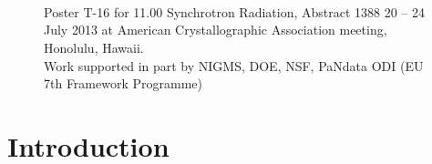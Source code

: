 \documentclass[11pt]{a0poster}
\begin{document}
\\
\fontsize{18}{22}\selectfont
\begin{minipage}[]{0.01\linewidth}~\end{minipage}\hfill\begin{minipage}[]{0.29\linewidth}
\fontsize{18}{22}\selectfont
\begin{figure}[H]
\begin{center}
      {
\fontsize{16}{20}\selectfont ~~\\
Poster T-16 for 11.00 Synchrotron Radiation, Abstract 1388
20 -- 24 July 2013 at American Crystallographic Association meeting, Honolulu, Hawaii.\\
Work supported in part by NIGMS, DOE, NSF, PaNdata ODI (EU 7th Framework Programme)}
\end{center}
\end{figure}

\vspace{-20mm}
\section*{Introduction}


\end{minipage}
\end{document}
